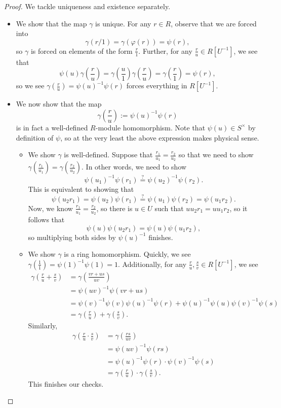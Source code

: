 \documentclass[../notes.tex]{subfiles}
\begin{document}
\begin{proof}
	We tackle uniqueness and existence separately.
	\begin{itemize}
		\item We show that the map $\gamma$ is unique. For any $r\in R$, observe that we are forced into
		\[\gamma(r/1)=\gamma(\varphi(r))=\psi(r),\]
		so $\gamma$ is forced on elements of the form $\frac r1$. Further, for any $\frac ru\in R\left[U^{-1}\right]$, we see that
		\[\psi(u)\gamma\left(\frac ru\right)=\gamma\left(\frac u1\right)\gamma\left(\frac ru\right)=\gamma\left(\frac r1\right)=\psi(r),\]
		so we see $\gamma\left(\frac ru\right)=\psi(u)^{-1}\psi(r)$ forces everything in $R\left[U^{-1}\right]$.
		\item We now show that the map
		\[\gamma\left(\frac ru\right):=\psi(u)^{-1}\psi(r)\]
		is in fact a well-defined $R$-module homomorphism. Note that $\psi(u)\in S^\times$ by definition of $\psi$, so at the very least the above expression makes physical sense.
		\begin{itemize}
			\item We show $\gamma$ is well-defined. Suppose that $\frac{r_1}{u_1}=\frac{r_2}{u_2}$ so that we need to show $\gamma\left(\frac{r_1}{u_1}\right)=\gamma\left(\frac{r_2}{u_2}\right)$. In other words, we need to show
			\[\psi(u_1)^{-1}\psi(r_1)\stackrel?=\psi(u_2)^{-1}\psi(r_2).\]
			This is equivalent to showing that
			\[\psi(u_2r_1)=\psi(u_2)\psi(r_1)\stackrel?=\psi(u_1)\psi(r_2)=\psi(u_1r_2).\]
			Now, we know $\frac{r_1}{u_1}=\frac{r_2}{u_2}$, so there is $u\in U$ such that $uu_2r_1=uu_1r_2$, so it follows that
			\[\psi(u)\psi(u_2r_1)=\psi(u)\psi(u_1r_2),\]
			so multiplying both sides by $\psi(u)^{-1}$ finishes.
			\item We show $\gamma$ is a ring homomorphism. Quickly, we see $\gamma\left(\frac11\right)=\psi(1)^{-1}\psi(1)=1$. Additionally, for any $\frac ru,\frac sv\in R\left[U^{-1}\right]$, we see
			\begin{align*}
				\gamma\left(\frac ru+\frac sv\right) &= \gamma\left(\frac{vr+us}{uv}\right) \\
				&= \psi(uv)^{-1}\psi(vr+us) \\
				&= \psi(v)^{-1}\psi(v)\psi(u)^{-1}\psi(r)+\psi(u)^{-1}\psi(u)\psi(v)^{-1}\psi(s) \\
				&= \gamma\left(\frac ru\right)+\gamma\left(\frac sv\right).
			\end{align*}
			Similarly,
			\begin{align*}
				\gamma\left(\frac ru\cdot\frac sv\right) &= \gamma\left(\frac{rs}{uv}\right) \\
				&= \psi(uv)^{-1}\psi(rs) \\
				&= \psi(u)^{-1}\psi(r)\cdot\psi(v)^{-1}\psi(s) \\
				&= \gamma\left(\frac ru\right)\cdot\gamma\left(\frac sv\right).
			\end{align*}
			This finishes our checks.
			\qedhere
		\end{itemize}
	\end{itemize}
\end{proof}
\end{document}
